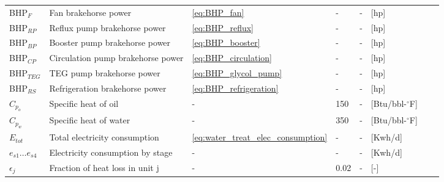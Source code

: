 \documentclass[11pt]{report}
\begin{document}
\begin{landscape}
\begin{scriptsize}
\tablelasttail{\bottomrule}
\label{tab:defaults_surface_processing}
\begin{supertabular*}{1\columnwidth}
{p{0.08\columnwidth}p{0.26\columnwidth}p{0.05\columnwidth}p{0.1\columnwidth}p{0.06\columnwidth}p{0.15\columnwidth}p{0.11\columnwidth}p{0.05\columnwidth}}
BHP$_{F}$ & Fan brakehorse power & \eqref{eq:BHP_fan} & - & - & [hp] & \cite[p. 118]{Manning1991} & \\ 
BHP$_{RP}$ & Reflux pump brakehorse power & \eqref{eq:BHP_reflux} & - & - & [hp] & \cite[p. 118]{Manning1991} & \\ 
BHP$_{BP}$ & Booster pump brakehorse power & \eqref{eq:BHP_booster} & - & - & [hp] & \cite[p. 118]{Manning1991} & \\ 
BHP$_{CP}$ & Circulation pump brakehorse power & \eqref{eq:BHP_circulation} & - & - & [hp] & \cite[p. 118]{Manning1991} & \\ 
BHP$_{TEG}$ & TEG pump brakehorse power & \eqref{eq:BHP_glycol_pump} & - & - & [hp] & \cite[p. 455]{Mcallister2009} & \\
BHP$_{RS}$ & Refrigeration brakehorse power & \eqref{eq:BHP_refrigeration} & - & - & [hp] & \cite{Nawaz2010} & \\
$C_{p_{o}}$ & Specific heat of oil & - & 150 & - & [Btu/bbl-$^{\circ}${F}] & \cite[p. 136]{Manning1995} & \\ 
$C_{p_{w}}$ & Specific heat of water & - & 350 & - & [Btu/bbl-$^{\circ}${F}] & \cite[p. 136]{Manning1995} & \\ 
$E_{tot}$ & Total electricity consumption & \eqref{eq:water_treat_elec_consumption} & - & - & [Kwh/d] & & \\ 
$e_{s1} \ldots e_{s4}$ & Electricity consumption by stage & - & - & - & [Kwh/d] & & \\ 
$\epsilon_j$ & Fraction of heat loss in unit j & - & 0.02 & - & [-] & \cite[p. 136]{Manning1995} & \\ 

\end{supertabular*}
\end{scriptsize}
\end{landscape}
\end{document}
